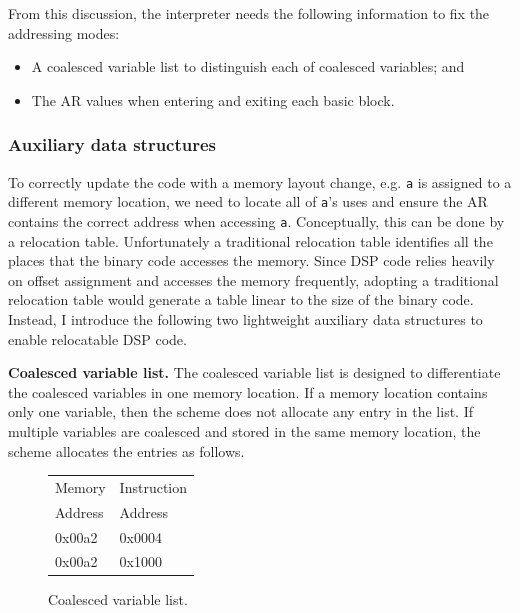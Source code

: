 From this discussion, the interpreter needs the following information to fix the addressing modes:
\begin{itemize}
	\item A coalesced variable list to distinguish each of coalesced variables; and
	\item The AR values when entering and exiting each basic block.
\end{itemize}

\subsubsection{Auxiliary data structures}
To correctly update the code with a memory layout change, e.g. {\tt a} is assigned to a different memory location, we 
need to locate all of {\tt a}'s uses and ensure the AR contains the correct address when accessing {\tt a}. 
Conceptually, this can be done by a relocation table. Unfortunately a traditional relocation table identifies all the 
places that the binary code accesses the memory. Since DSP code relies heavily on offset assignment and accesses the 
memory frequently, adopting a traditional relocation table would generate a table linear to the size of the binary 
code. Instead, I introduce the following two lightweight auxiliary data structures to enable relocatable DSP code.

{\bf Coalesced variable list.}
The coalesced variable list is designed to differentiate the coalesced variables in one memory location. If a memory 
location contains only one variable, then the scheme does not allocate any entry in the list. If multiple variables are 
coalesced and stored in the same memory location, the scheme allocates the entries as follows. 

\begin{figure}[htdp]
\begin{small}
\begin{center}
\begin{tabular}{p{1in} p{1in} }  \hline
Memory  & Instruction  \\
Address & Address \\ \hline\hline
0x00a2 & 0x0004  \\
0x00a2 & 0x1000  \\ \hline
\end{tabular}
\end{center}
\caption{Coalesced variable list.}
\label{memvar}
\end{small}
\end{figure}

